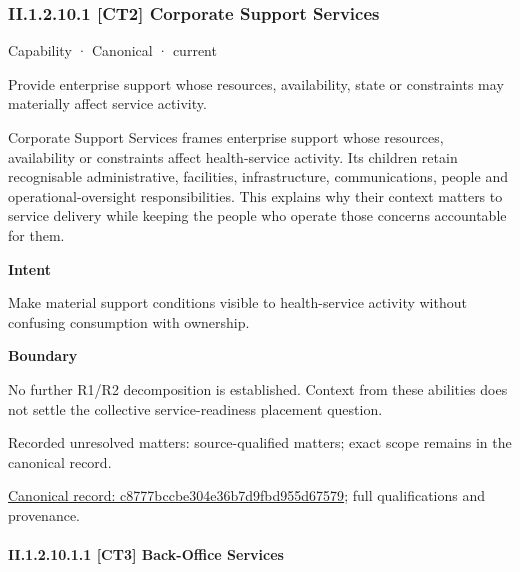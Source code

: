\subsubsection*{II.1.2.10.1 [CT2] Corporate Support Services}
\label{navigation:II.1.2.10.1}

\label{element:c8777bccbe304e36b7d9fbd955d67579}
{\small Capability · Canonical · current}\par

Provide enterprise support whose resources, availability, state or constraints may materially affect service activity.



Corporate Support Services frames enterprise support whose resources, availability or constraints affect health-service activity. Its children retain recognisable administrative, facilities, infrastructure, communications, people and operational-oversight responsibilities. This explains why their context matters to service delivery while keeping the people who operate those concerns accountable for them.



\textbf{Intent}



Make material support conditions visible to health-service activity without confusing consumption with ownership.



\textbf{Boundary}



No further R1/R2 decomposition is established. Context from these abilities does not settle the collective service-readiness placement question.


{\small Recorded unresolved matters: source-qualified matters; exact scope remains in the canonical record.}\par
{\footnotesize \href{../../../../continuum/strategy/capability/c8777bccbe304e36b7d9fbd955d67579.md}{Canonical record: c8777bccbe304e36b7d9fbd955d67579}; full qualifications and provenance.}\par
\paragraph*{II.1.2.10.1.1 [CT3] Back-Office Services}
\label{navigation:II.1.2.10.1.1}

